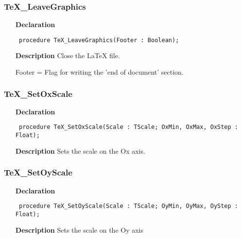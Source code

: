 \documentclass[12pt,a4paper,oneside]{report}
\newcommand{\declarationitem}[1]{\textbf{#1}}
\newcommand{\descriptiontitle}[1]{\textbf{#1}}
\newcommand{\code}[1]{\texttt{#1}}
\begin{document}
\subsubsection{TeX{\_}LeaveGraphics}
\label{utexplot-TeX_LeaveGraphics}
\begin{itemize}\item[\declarationitem{Declaration}\hfill]
	\begin{flushleft}
		\code{
			procedure TeX{\_}LeaveGraphics(Footer : Boolean);}
		
	\end{flushleft}
	
	\par
	\item[\descriptiontitle{Description}]
	Close the LaTeX file.
	
	Footer = Flag for writing the 'end of document' section.
	
\end{itemize}
\subsubsection{TeX{\_}SetOxScale}
\label{utexplot-TeX_SetOxScale}
\begin{itemize}\item[\declarationitem{Declaration}\hfill]
	\begin{flushleft}
		\code{
			procedure TeX{\_}SetOxScale(Scale : TScale; OxMin, OxMax, OxStep : Float);}
		
	\end{flushleft}
	
	\par
	\item[\descriptiontitle{Description}]
	Sets the scale on the Ox axis.
	
\end{itemize}
\subsubsection{TeX{\_}SetOyScale}
\label{utexplot-TeX_SetOyScale}
\begin{itemize}\item[\declarationitem{Declaration}\hfill]
	\begin{flushleft}
		\code{
			procedure TeX{\_}SetOyScale(Scale : TScale; OyMin, OyMax, OyStep : Float);}
		
	\end{flushleft}
	
	\par
	\item[\descriptiontitle{Description}]
	Sets the scale on the Oy axis
	
\end{itemize}
\end{document}
